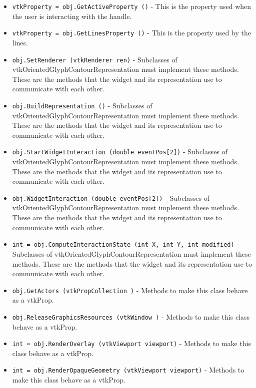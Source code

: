\begin{itemize}
\item  \verb|vtkProperty = obj.GetActiveProperty ()| -  This is the property used when the user is interacting
 with the handle.

\item  \verb|vtkProperty = obj.GetLinesProperty ()| -  This is the property used by the lines.

\item  \verb|obj.SetRenderer (vtkRenderer ren)| -  Subclasses of vtkOrientedGlyphContourRepresentation must implement these methods. These
 are the methods that the widget and its representation use to
 communicate with each other.

\item  \verb|obj.BuildRepresentation ()| -  Subclasses of vtkOrientedGlyphContourRepresentation must implement these methods. These
 are the methods that the widget and its representation use to
 communicate with each other.

\item  \verb|obj.StartWidgetInteraction (double eventPos[2])| -  Subclasses of vtkOrientedGlyphContourRepresentation must implement these methods. These
 are the methods that the widget and its representation use to
 communicate with each other.

\item  \verb|obj.WidgetInteraction (double eventPos[2])| -  Subclasses of vtkOrientedGlyphContourRepresentation must implement these methods. These
 are the methods that the widget and its representation use to
 communicate with each other.

\item  \verb|int = obj.ComputeInteractionState (int X, int Y, int modified)| -  Subclasses of vtkOrientedGlyphContourRepresentation must implement these methods. These
 are the methods that the widget and its representation use to
 communicate with each other.

\item  \verb|obj.GetActors (vtkPropCollection )| -  Methods to make this class behave as a vtkProp.

\item  \verb|obj.ReleaseGraphicsResources (vtkWindow )| -  Methods to make this class behave as a vtkProp.

\item  \verb|int = obj.RenderOverlay (vtkViewport viewport)| -  Methods to make this class behave as a vtkProp.

\item  \verb|int = obj.RenderOpaqueGeometry (vtkViewport viewport)| -  Methods to make this class behave as a vtkProp.


\end{itemize}
